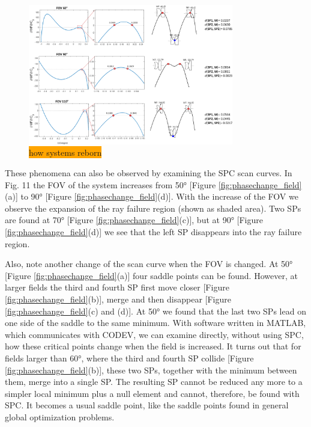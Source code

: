 \begin{figure}[h!]
    \centering
    \includegraphics[width=0.8\textwidth]{chapter-3/figures/SystemReborn_vt.png}
    \caption{\colorbox{orange}{how systems reborn}}
    \label{fig:systemreborn}
\end{figure}




These phenomena can also be observed by examining the SPC scan curves. In Fig. 11 the FOV of the system increases from 50° [Figure \ref{fig:phasechange_field}(a)] to 90° [Figure \ref{fig:phasechange_field}(d)]. With the increase of the FOV we observe the expansion of the ray failure region (shown as shaded area). Two SPs are found at 70° [Figure \ref{fig:phasechange_field}(c)], but at 90° [Figure \ref{fig:phasechange_field}(d)] we see that the left SP disappears into the ray failure region.

Also, note another change of the scan curve when the FOV is changed. At 50° [Figure \ref{fig:phasechange_field}(a)] four saddle points can be found. However, at larger fields the third and fourth SP first move closer [Figure \ref{fig:phasechange_field}(b)], merge and then disappear [Figure \ref{fig:phasechange_field}(c) and (d)]. At 50° we found that the last two SPs lead on one side of the saddle to the same minimum. With software written in MATLAB, which communicates with CODEV, we can examine directly, without using SPC, how these critical points change when the field is increased. It turns out that for fields larger than 60°, where the third and fourth SP collide [Figure \ref{fig:phasechange_field}(b)], these two SPs, together with the minimum between them, merge into a single SP. The resulting SP cannot be reduced any more to a simpler local minimum plus a null element and cannot, therefore, be found with SPC. It becomes a usual saddle point, like the saddle points found in general global optimization problems.

